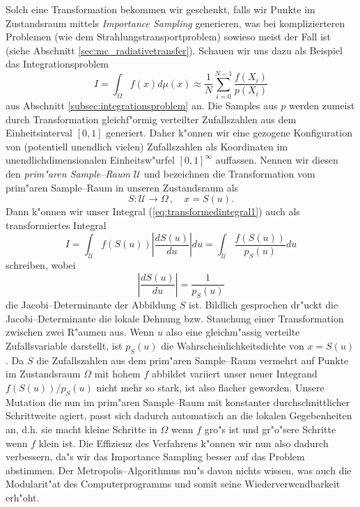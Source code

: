 	Solch eine Transformation bekommen wir geschenkt, falls wir Punkte im Zustandsraum mittels {\em Importance Sampling} generieren, was bei komplizierteren Problemen (wie dem Strahlungstransportproblem) sowieso meist der Fall ist (siehe Abschnitt \ref{sec:mc_radiativetransfer}). Schauen wir uns dazu als Beispiel das Integrationsproblem
	\begin{equation}
		I=\int_\Omega f(x) d\mu(x)\approx \frac{1}{N}\sum_{i=0}^{N-1} \frac{f(X_i)}{p(X_i)}
		\label{eq:transformedintegral1}
	\end{equation}
	aus Abschnitt \ref{subsec:integrationsproblem} an. Die Samples aus $p$ werden zumeist durch Transformation gleichf"ormig verteilter Zufallszahlen aus dem Einheitsinterval $[0,1]$ generiert. Daher k"onnen wir eine gezogene Konfiguration von (potentiell unendlich vielen) Zufallszahlen als Koordinaten im unendlichdimensionalen Einheitsw"urfel $[0,1]^\infty$ auffassen. Nennen wir diesen den {\em prim"aren Sample--Raum} $\mathcal{U}$ und bezeichnen die Transformation vom prim"aren Sample--Raum in unseren Zustandsraum als
	$$S : \mathcal{U} \to \Omega\,,\quad x=S(u).$$
	Dann k"onnen wir unser Integral (\ref{eq:transformedintegral1}) auch als transformiertes Integral
	$$I=\int_\mathcal{U} f(S(u)) \left|\frac{dS(u)}{du}\right|du=\int_\mathcal{U} \frac{f(S(u))}{p_S(u)}du$$
	schreiben, wobei
	$$\left|\frac{dS(u)}{du}\right|=\frac{1}{p_S(u)}$$
	die Jacobi--Determinante der Abbildung $S$ ist. Bildlich gesprochen dr"uckt die Jacobi--Determinante die lokale Dehnung bzw. Stauchung einer Transformation zwischen zwei R"aumen aus. Wenn $u$ also eine gleichm"assig verteilte Zufallsvariable darstellt, ist $p_S(u)$ die Wahrscheinlichkeitsdichte von $x=S(u)$. Da $S$ die Zufallszahlen aus dem prim"aren Sample--Raum vermehrt auf Punkte im Zustandsraum $\Omega$ mit hohem $f$ abbildet variiert unser neuer Integrand $f(S(u))/p_S(u)$ nicht mehr so stark, ist also flacher geworden. Unsere Mutation die nun im prim"aren Sample--Raum mit konstanter durchschnittlicher Schrittweite agiert, passt sich dadurch automatisch an die lokalen Gegebenheiten an, d.h. sie macht kleine Schritte in $\Omega$ wenn $f$ gro"s ist und gr"o"sere Schritte wenn $f$ klein ist. Die Effizienz des Verfahrens k"onnen wir nun also dadurch verbessern, da"s wir das Importance Sampling besser auf das Problem abstimmen. Der Metropolis--Algorithmus mu"s davon nichts wissen, was auch die Modularit"at des Computerprogramms und somit seine Wiederverwendbarkeit erh"oht.

